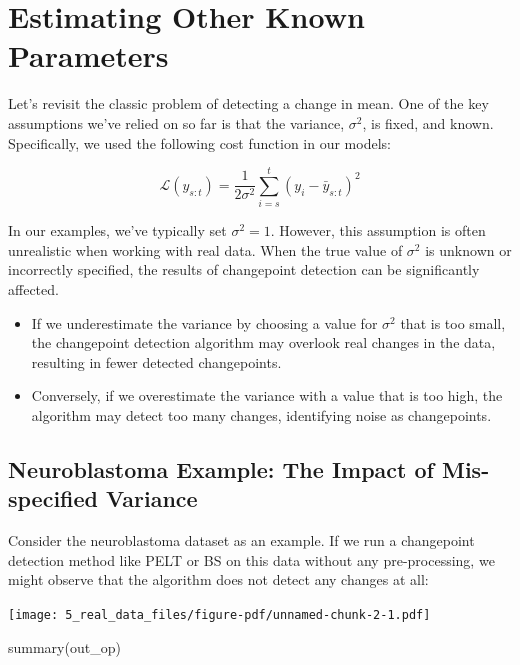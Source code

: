\documentclass[
  letterpaper,
  DIV=11,
  numbers=noendperiod]{scrreprt}
\newenvironment{Shaded}{\begin{snugshade}}{\end{snugshade}}
\newcommand{\FunctionTok}[1]{\textcolor[rgb]{0.28,0.35,0.67}{#1}}
\newcommand{\NormalTok}[1]{\textcolor[rgb]{0.00,0.23,0.31}{#1}}
\providecommand{\tightlist}{%
  \setlength{\itemsep}{0pt}\setlength{\parskip}{0pt}}\usepackage{longtable,booktabs,array}
\begin{document}
\section{Estimating Other Known
Parameters}\label{estimating-other-known-parameters}

Let's revisit the classic problem of detecting a change in mean. One of
the key assumptions we've relied on so far is that the variance,
\(\sigma^2\), is fixed, and known. Specifically, we used the following
cost function in our models:

\[
\mathcal{L}(y_{s:t}) = \frac{1}{2\sigma^2}  \sum_{i = s}^{t} \left ( y_i - \bar{y}_{s:t} \right)^2
\]

In our examples, we've typically set \(\sigma^2 = 1\). However, this
assumption is often unrealistic when working with real data. When the
true value of \(\sigma^2\) is unknown or incorrectly specified, the
results of changepoint detection can be significantly affected.

\begin{itemize}
\tightlist
\item
  If we underestimate the variance by choosing a value for \(\sigma^2\)
  that is too small, the changepoint detection algorithm may overlook
  real changes in the data, resulting in fewer detected changepoints.
\item
  Conversely, if we overestimate the variance with a value that is too
  high, the algorithm may detect too many changes, identifying noise as
  changepoints.
\end{itemize}

\subsection{Neuroblastoma Example: The Impact of Mis-specified
Variance}\label{neuroblastoma-example-the-impact-of-mis-specified-variance}

Consider the neuroblastoma dataset as an example. If we run a
changepoint detection method like PELT or BS on this data without any
pre-processing, we might observe that the algorithm does not detect any
changes at all:

\texttt{[image: 5\_real\_data\_files/figure-pdf/unnamed-chunk-2-1.pdf]}

\begin{Shaded}
\begin{Highlighting}[]
\FunctionTok{summary}\NormalTok{(out\_op)}
\end{Highlighting}
\end{Shaded}
\end{document}

